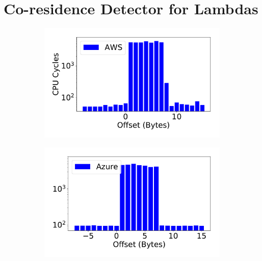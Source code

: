 

\section{Co-residence Detector for Lambdas}
\label{sec:methodology}

\begin{figure}[h!]
\begin{subfigure}{.33\textwidth}
  \centering
  \includegraphics[width=.99\linewidth]{fig/membus_aws.pdf}
\end{subfigure}%
\begin{subfigure}{.33\textwidth}
  \centering
  \includegraphics[width=.99\linewidth]{fig/membus_azure.pdf}
\end{subfigure}
\begin{subfigure}{.33\textwidth}

\end{subfigure}
\end{figure}
